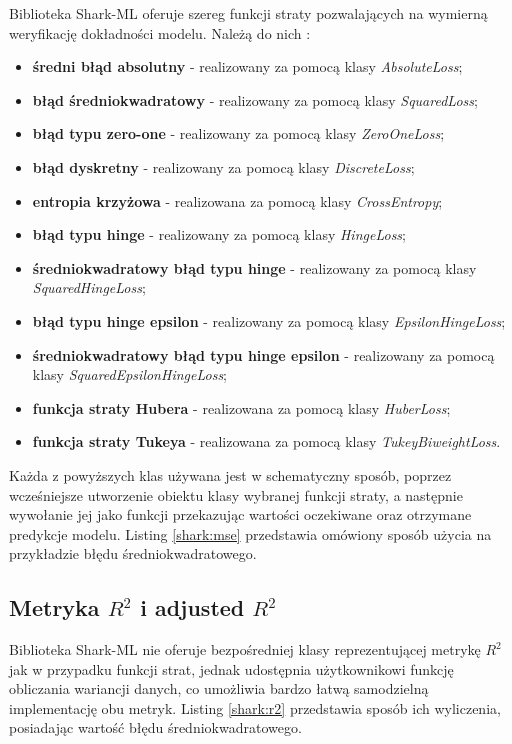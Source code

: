 Biblioteka Shark-ML oferuje szereg funkcji straty pozwalających na wymierną weryfikację dokładności modelu. Należą do nich \cite{shark:loss}:

\begin{itemize}
	\item \textbf{średni błąd absolutny} - realizowany za pomocą klasy \textit{AbsoluteLoss};
	\item \textbf{błąd średniokwadratowy} - realizowany za pomocą klasy \textit{SquaredLoss};
	\item \textbf{błąd typu zero-one} - realizowany za pomocą klasy \textit{ZeroOneLoss};
	\item \textbf{błąd dyskretny} - realizowany za pomocą klasy \textit{DiscreteLoss};
	\item \textbf{entropia krzyżowa} - realizowana za pomocą klasy \textit{CrossEntropy};
	\item \textbf{błąd typu hinge} - realizowany za pomocą klasy \textit{HingeLoss};
	\item \textbf{średniokwadratowy błąd typu hinge} - realizowany za pomocą klasy \textit{SquaredHingeLoss};
	\item \textbf{błąd typu hinge epsilon} - realizowany za pomocą klasy \textit{EpsilonHingeLoss};
	\item \textbf{średniokwadratowy błąd typu hinge epsilon} - realizowany za pomocą klasy \textit{SquaredEpsilonHingeLoss};
	\item \textbf{funkcja straty Hubera} - realizowana za pomocą klasy \textit{HuberLoss};
	\item \textbf{funkcja straty Tukeya} - realizowana za pomocą klasy \textit{TukeyBiweightLoss}.
\end{itemize}

Każda z powyższych klas używana jest w schematyczny sposób, poprzez wcześniejsze utworzenie obiektu klasy wybranej funkcji straty, a następnie wywołanie jej jako funkcji przekazując wartości oczekiwane oraz otrzymane predykcje modelu. Listing \ref{shark:mse} przedstawia omówiony sposób użycia na przykładzie błędu średniokwadratowego.


\subsection{Metryka $R^2$ i adjusted $R^2$}

Biblioteka Shark-ML nie oferuje bezpośredniej klasy reprezentującej metrykę $R^2$ jak w przypadku funkcji strat, jednak udostępnia użytkownikowi funkcję obliczania wariancji danych, co umożliwia bardzo łatwą samodzielną implementację obu metryk. Listing \ref{shark:r2} przedstawia sposób ich wyliczenia, posiadając wartość błędu średniokwadratowego.

